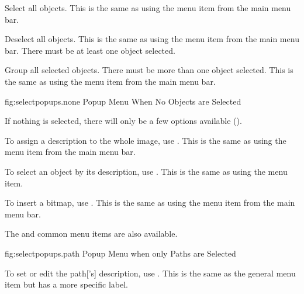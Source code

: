 
Select all \glspl{object}.
This is the same as using the  menu item from the
main menu bar.


Deselect all \glspl{object}.
This is the same as using the  menu item from the
main menu bar. There must be at least one \gls{object} selected.


Group all selected \glspl{object}. There must be more than one
object selected.
This is the same as using the  menu item from the
main menu bar.



\FloatFig
  {fig:selectpopups.none}
  {}
  {Popup Menu When No Objects are Selected}

If nothing is selected, there will only be a few options available
().


To assign a description to the whole image, use
. This is the same as using the
 menu item from the main menu bar.


To select an \gls{object} by its description, use
. This is the same as using the
 menu item.


To insert a \gls{bitmap}, use . This
is the same as using the  menu item from the main menu bar.

The  and  common menu
items are also available.



\FloatFig
  {fig:selectpopups.path}
  {}
  {Popup Menu when only Paths are Selected}


To set or edit the \gls{path}['s] description, use
. This is the same as
the general  menu item but has a more specific label.

